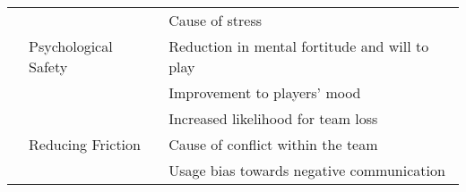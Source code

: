 \begin{table}[!htbp]
{\begin{tabular}{ll|l}
\multicolumn{1}{l|}{}                                                                                                                                                                                    & \multirow{3}{*}{Psychological Safety}                                                                       & Cause of stress                                                     \\ \cline{3-3} 
\multicolumn{1}{l|}{}                                                                                                                                                                                    &                                                                                                             & Reduction in mental fortitude and will to play                      \\ \cline{3-3} 
\multicolumn{1}{l|}{}                                                                                                                                                                                    &                                                                                                             & Improvement to players' mood                                        \\ \cline{2-3} 
\multicolumn{1}{l|}{}                                                                                                                                                                                    & \multirow{5}{*}{Reducing Friction}                                                                          & Increased likelihood for team loss                                  \\ \cline{3-3} 
\multicolumn{1}{l|}{}                                                                                                                                                                                    &                                                                                                             & Cause of conflict within the team                                   \\ \cline{3-3} 
\multicolumn{1}{l|}{}                                                                                                                                                                                    &                                                                                                             & Usage bias towards negative communication                           \\ \cline{3-3} 

\end{tabular}}
\end{table}
